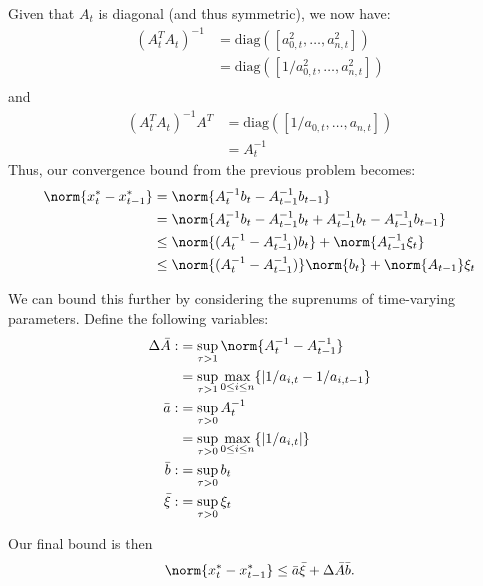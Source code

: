 \documentclass{homework}
\begin{document}
\begin{letterenum}
    \item Given that $A_t$ is diagonal (and thus symmetric), we now have:
    \begin{align*}
        (A_t^TA_t)^{-1} &= \text{diag}([a_{0,t}^2, \dots, a_{n,t}^2]) \\
            &= \text{diag}([1/a_{0,t}^2, \dots, a_{n,t}^2]) \\
    \end{align*}
    and
    \begin{align*}
        (A_t^TA_t)^{-1} A^T &= \text{diag}([1/a_{0,t}, \dots, a_{n,t}]) \\
            &= A_t^{-1}
    \end{align*}
    Thus, our convergence bound from the previous problem becomes:
    \begin{align*}
        \norm{x_t^* - x_{t-1}^*} &= \norm{A_t^{-1} b_t - A_{t-1}^{-1} b_{t-1}} \\
            &= \norm{A_t^{-1} b_t - A_{t-1}^{-1} b_t
                                    + A_{t-1}^{-1} b_t - A_{t-1}^{-1} b_{t-1}} \\
            &\leq \norm{(A_t^{-1} - A_{t-1}^{-1}) b_t} + \norm{A_{t-1}^{-1} \xi_t} \\
            &\leq \norm{(A_t^{-1} - A_{t-1}^{-1})} \norm{b_t}
                + \norm{A_{t-1}} \xi_t
    \end{align*}

    We can bound this further by considering the suprenums of time-varying
    parameters. Define the following variables:
    \begin{align*}
        \Delta \bar{A} :&= \sup_{\tau > 1} \norm{A_t^{-1} - A_{t-1}^{-1}} \\
            &= \sup_{\tau > 1} \max_{0\leq i \leq n}
                \{|1 / a_{i,t} - 1 / a_{i,t-1}\} \\
        \bar{a} :&= \sup_{\tau > 0} {A_t^{-1}} \\
            &= \sup_{\tau > 0} \max_{0\leq i \leq n} \{
                |1 / a_{i,t}|
            \} \\
        \bar{b} :&= \sup_{\tau > 0} b_t \\
        \bar{\xi} :&= \sup_{\tau > 0} \xi_t
    \end{align*}
    
    Our final bound is then
    \begin{equation*}
        \norm{x_t^* - x_{t-1}^*} \leq \bar{a} \bar{\xi} + \Delta \bar{A} \bar{b}.
    \end{equation*}
\end{letterenum}
\end{document}
